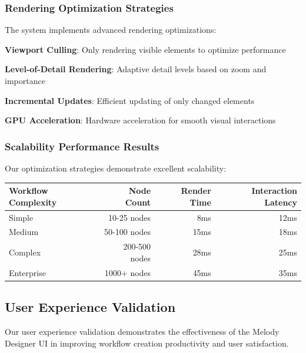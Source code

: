 \subsubsection*{Rendering Optimization Strategies}

The system implements advanced rendering optimizations:

\begin{expandedlist}
    \item \textbf{Viewport Culling}: Only rendering visible elements to optimize performance
    \item \textbf{Level-of-Detail Rendering}: Adaptive detail levels based on zoom and importance
    \item \textbf{Incremental Updates}: Efficient updating of only changed elements
    \item \textbf{GPU Acceleration}: Hardware acceleration for smooth visual interactions
\end{expandedlist}

\subsubsection*{Scalability Performance Results}

Our optimization strategies demonstrate excellent scalability:

\begin{center}
\begin{tabular}{@{}lrrr@{}}
\toprule
\textbf{Workflow Complexity} & \textbf{Node Count} & \textbf{Render Time} & \textbf{Interaction Latency} \\
\midrule
Simple & 10-25 nodes & 8ms & 12ms \\
Medium & 50-100 nodes & 15ms & 18ms \\
Complex & 200-500 nodes & 28ms & 25ms \\
Enterprise & 1000+ nodes & 45ms & 35ms \\
\bottomrule
\end{tabular}
\end{center}

\subsection*{User Experience Validation}

Our user experience validation demonstrates the effectiveness of the Melody Designer UI in improving workflow creation productivity and user satisfaction.

